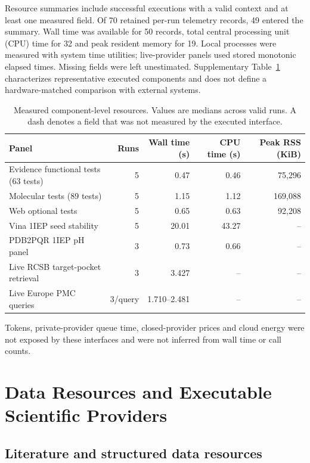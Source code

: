 \documentclass{article}
\begin{document}
Resource summaries include successful executions with a valid context and at least one measured field. Of 70 retained per-run telemetry records, 49 entered the summary. Wall time was available for 50 records, total central processing unit (CPU) time for 32 and peak resident memory for 19. Local processes were measured with system time utilities; live-provider panels used stored monotonic elapsed times. Missing fields were left unestimated. Supplementary Table~\ref{tab:sup-resources} characterizes representative executed components and does not define a hardware-matched comparison with external systems.

\begin{table}[htbp]
\centering
\small
\caption{Measured component-level resources. Values are medians across valid runs. A dash denotes a field that was not measured by the executed interface.}
\label{tab:sup-resources}
\begin{tabular}{lrrrr}
\toprule
Panel & Runs & Wall time (s) & CPU time (s) & Peak RSS (KiB) \\
\midrule
Evidence functional tests (63 tests) & 5 & 0.47 & 0.46 & 75,296 \\
Molecular tests (89 tests) & 5 & 1.15 & 1.12 & 169,088 \\
Web optional tests & 5 & 0.65 & 0.63 & 92,208 \\
Vina 1IEP seed stability & 5 & 20.01 & 43.27 & -- \\
PDB2PQR 1IEP pH panel & 3 & 0.73 & 0.66 & -- \\
Live RCSB target-pocket retrieval & 3 & 3.427 & -- & -- \\
Live Europe PMC queries & 3/query & 1.710--2.481 & -- & -- \\
\bottomrule
\end{tabular}
\end{table}

Tokens, private-provider queue time, closed-provider prices and cloud energy were not exposed by these interfaces and were not inferred from wall time or call counts.

\section{Data Resources and Executable Scientific Providers}\label{secB}

\subsection{Literature and structured data resources}
\end{document}
